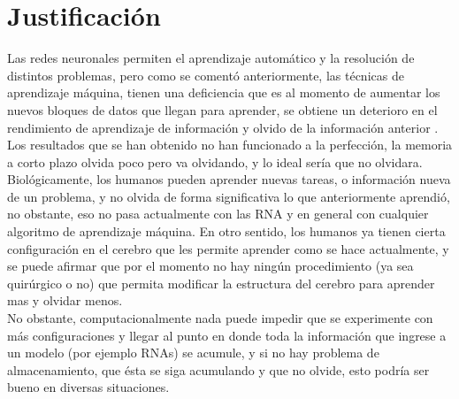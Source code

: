 \chapter{Justificación}
	
	
    Las redes neuronales permiten el aprendizaje automático y la resolución 
    de distintos problemas,  pero como se comentó anteriormente,  las técnicas 
    de aprendizaje máquina, tienen una deficiencia que es al momento de aumentar 
    los nuevos bloques de datos que llegan para aprender,  se obtiene un deterioro 
    en el rendimiento de aprendizaje de información y olvido de la información anterior \cite{bullinaria2009}.\\
    
    Los resultados que se han obtenido no han funcionado a la perfección, la 
    memoria a corto plazo olvida poco pero va olvidando, y lo ideal sería que no 
    olvidara. Biológicamente, los humanos pueden aprender nuevas tareas, o información 
    nueva de un problema, y no olvida de forma significativa lo que anteriormente 
    aprendió, no obstante, eso no pasa actualmente con las RNA y en general con 
    cualquier algoritmo de aprendizaje máquina. En otro sentido, los humanos 
    ya tienen cierta configuración en el cerebro que les permite aprender como 
    se hace actualmente,  y se puede afirmar que por el momento no hay ningún 
    procedimiento (ya sea quirúrgico o no) que permita modificar la estructura del cerebro 
    para aprender mas y olvidar menos.\\

    No obstante,  computacionalmente nada puede impedir que se experimente con más 
    configuraciones y llegar al punto en donde toda la información que ingrese a un 
    modelo (por ejemplo RNAs) se acumule, y si no hay problema de almacenamiento, que \'esta se siga 
    acumulando y que no olvide, esto podría ser bueno en diversas situaciones.\\

